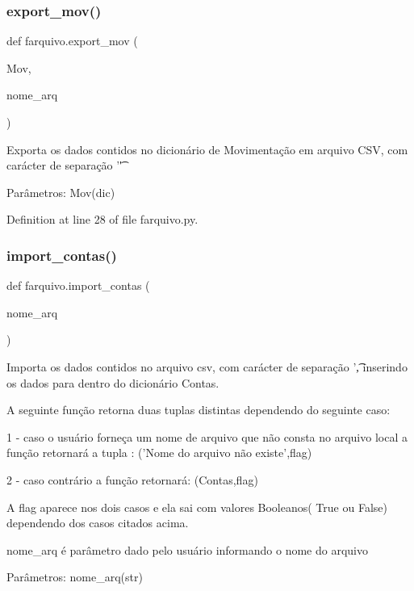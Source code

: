 \subsubsection{export\_mov()}
{\footnotesize\ttfamily def farquivo.\+export\+\_\+mov (\begin{DoxyParamCaption}\item[{}]{Mov,  }\item[{}]{nome\+\_\+arq }\end{DoxyParamCaption})}

\begin{DoxyVerb}Exporta os dados contidos no dicionário de Movimentação em arquivo CSV, com carácter de separação '\t'

Parâmetros:
Mov(dic)\end{DoxyVerb}
 

Definition at line 28 of file farquivo.\+py.

\mbox{\label{namespacefarquivo_a07614225b4ff56afa80eac14cd04bfb5}} 
\subsubsection{import\_contas()}
{\footnotesize\ttfamily def farquivo.\+import\+\_\+contas (\begin{DoxyParamCaption}\item[{}]{nome\+\_\+arq }\end{DoxyParamCaption})}

\begin{DoxyVerb}Importa os dados contidos no arquivo csv, com carácter de separação '\t, inserindo
os dados para dentro do dicionário Contas.

A seguinte função retorna duas tuplas distintas dependendo do seguinte caso:

1 - caso o usuário forneça um nome de arquivo que não consta no arquivo local a
  função retornará a tupla : ('Nome do arquivo não existe',flag)

2 - caso contrário a função retornará: (Contas,flag)

A flag aparece nos dois casos e ela sai com valores Booleanos( True ou False) dependendo
dos casos citados acima.


nome_arq é parâmetro dado pelo usuário informando o nome do arquivo


Parâmetros:
nome_arq(str)\end{DoxyVerb}
 


